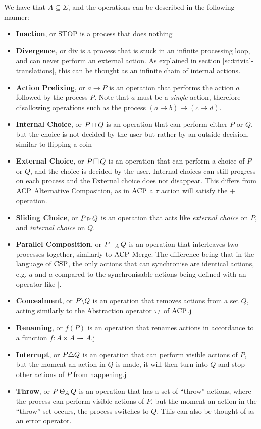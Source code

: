 \documentclass[../hons_project.tex]{subfiles}
\begin{document}
We have that $A \subseteq \Sigma$, and the operations can be described in the following manner:



\begin{itemize}
    \item \textbf{Inaction}, or $\mathrm{STOP}$ is a process that does nothing
    \item \textbf{Divergence}, or $\mathrm{div}$ is a process that is stuck in an infinite processing loop, and can never perform an external action. As explained in section \ref{sc:trivial-translations}, this can be thought as an infinite chain of internal actions.
    \item \textbf{Action Prefixing}, or $a \to P$ is an operation that performs the action $a$ followed by the process $P$. Note that $a$ must be a \textit{single} action, therefore disallowing operations such as the process $(a \to b) \to (c \to d)$.
    \item \textbf{Internal Choice}, or $P \sqcap Q$ is an operation that can perform either $P$ or $Q$, but the choice is not decided by the user but rather by an outside decision, similar to flipping a coin
    \item \textbf{External Choice}, or $P \,\square\, Q$ is an operation that can perform a choice of $P$ or $Q$, and the choice is decided by the user. Internal choices can still progress on each process and the External choice does not disappear. This differs from $\mathrm{ACP}$ Alternative Composition, as in $\mathrm{ACP}$ a $\tau$ action will satisfy the $+$ operation.
    \item \textbf{Sliding Choice}, or $P \triangleright Q$ is an operation that acts like \textit{external choice} on $P$, and \textit{internal choice} on $Q$.
    \item \textbf{Parallel Composition}, or $P \,\vert\vert_{A}\, Q$ is an operation that interleaves two processes together, similarly to $\mathrm{ACP}$ Merge. The difference being that in the language of $\mathrm{CSP}$, the only actions that can synchronise are identical actions, e.g. $a$ and $a$ compared to the synchronisable actions being defined with an operator like $\mid$.
    \item \textbf{Concealment}, or $P \backslash Q$ is an operation that removes actions from a set $Q$, acting similarly to the Abstraction operator $\tau_{I}$ of $\mathrm{ACP}$.j
    \item \textbf{Renaming}, or $f(P)$ is an operation that renames actions in accordance to a function $f : A \times A \rightharpoonup A$.j
    \item \textbf{Interrupt}, or $P \triangle Q$ is an operation that can perform visible actions of $P$, but the moment an action in $Q$ is made, it will then turn into $Q$ and stop other actions of $P$ from happening.j
    \item \textbf{Throw}, or $P \,\Theta_{A}\, Q$ is an operation that has a set of ``throw'' actions, where the process can perform visible actions of $P$, but the moment an action in the ``throw'' set occurs, the process switches to $Q$. This can also be thought of as an error operator.
\end{itemize}
\end{document}
